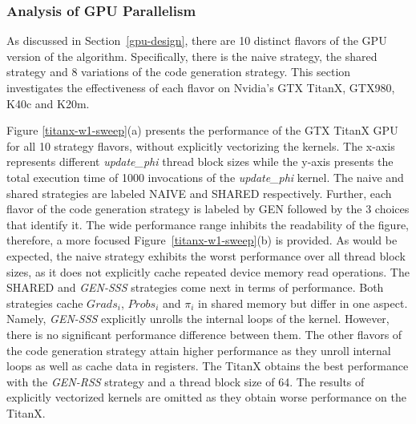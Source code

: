 \subsubsection{Analysis of GPU Parallelism}
As discussed in Section~\ref{gpu-design}, there are 10 distinct flavors of the
GPU version of the algorithm. Specifically, there is the naive strategy, the
shared strategy and 8 variations of the code generation strategy. This
section investigates the effectiveness of each flavor on Nvidia's GTX TitanX,
GTX980, K40c and K20m.

\begin{figure*}[t]	%
  \centering
  \caption{Execution time of 1000 \textit{update\_phi} invocations using the TitanX GPU,
  without explicit kernel vectorization, across a sweep of
  \textit{update\_phi} thread block
  sizes. Relevant model parameters: K=1024, M=4096, n=32.}
  \label{titanx-w1-sweep}
\end{figure*}

\begin{figure*}[t]	%
  \centering
  \caption{Execution time of 1000 \textit{update\_phi} invocations using the TitanX GPU,
  without explicit kernel vectorization, across a sweep of
  \textit{update\_phi} thread block
  sizes. Relevant model parameters: K=2048, M=4096, n=32.}
  \label{titanx-w1-sweep-2k}
\end{figure*}

Figure \ref{titanx-w1-sweep}(a) presents the performance of the GTX TitanX GPU
for all 10 strategy flavors, without explicitly vectorizing the kernels. The
x-axis represents different \textit{update\_phi} thread block sizes while the y-axis presents
the total execution time of 1000 invocations of the \textit{update\_phi} kernel. The
naive and shared strategies are labeled NAIVE and SHARED respectively. Further,
each flavor of the code generation strategy is labeled by GEN followed by the 3
choices that identify it.
%
The wide performance range inhibits the readability of the figure,
therefore, a more focused Figure~\ref{titanx-w1-sweep}(b) is provided. As would
be expected, the naive strategy exhibits the worst performance over all
thread block
sizes, as it does not explicitly cache repeated device memory read operations.
The SHARED and \textit{GEN-SSS} strategies come next in terms of performance.
Both strategies cache $Grads_i$, $Probs_i$ and $\pi_i$ in shared memory but
differ in one aspect. Namely, \textit{GEN-SSS} explicitly unrolls the internal
loops of the kernel. However, there is no significant performance difference
between them. The other flavors of the code generation strategy attain higher
performance as they unroll internal loops as well as cache data in
registers. The TitanX obtains the best performance with the \textit{GEN-RSS}
strategy and a thread block size of 64. The results of explicitly vectorized kernels
are omitted as they obtain worse performance on the TitanX.

